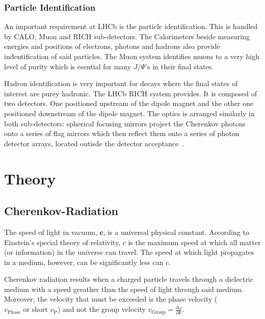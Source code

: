 \documentclass[10pt,twoside]{scrreprt}
\begin{document}
\subsection{Particle Identification} %
\label{sub:particle_identification}
An important requirement at LHCb is the particle identification. This is handled by CALO, Muon and RICH sub-detectors. The Calorimeters beside measuring energies and positions of electrons, photons and hadrons also provide indentification of said particles. The Muon system identifies muons to a very high level of purity which is esential for many \(J/\Psi\)'s in their final states.

Hadron identification is very important for decays where the final states of interest are purey hadronic. The LHCb RICH system provides. It is composed of two detectors. One positioned upstream of the dipole magnet and the other one positioned downstream of the dipole magnet. The optics is arranged similarly in both sub-detectors: spherical focusing mirrors project the Cherenkov photons onto a series of flag mirrors which then reflect them onto a series of photon detector arrays, located outisde the detector acceptance~\cite{Powell:2011}.




\chapter{Theory}

\section{Cherenkov-Radiation} %
\label{sec:cherenkov_radiation}

The speed of light in vacuum, \( \mathbf{c} \), is a universal physical constant. According to Einstein's special theory of relativity, \( c \) is the maximum speed at which all matter (or information) in the universe can travel. The speed at which light propagates in a medium, however, can be significantly less can \( c \).

Cherenkov radiation results when a charged particle travels through a dielectric medium with a speed greather than the speed of light through said medium. Moreover, the velocity that must be exceeded is the phase velocity (\( v_{\text{Phase}} \text{ or short } v_{\text{P}} \)) and not the group velocity \( v_{\text{Group}} = \frac{\partial \omega}{\partial k} \).
\end{document}
